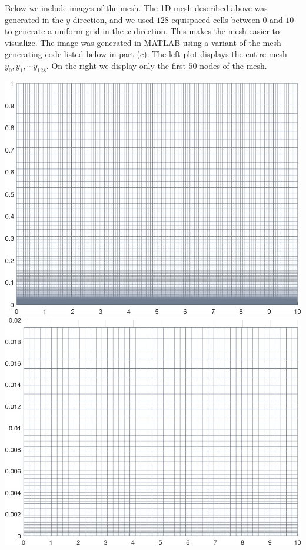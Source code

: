 \documentclass{article}
\begin{document}
Below we include images of the mesh. The 1D mesh described above was generated in the $y$-direction, and we used $128$ equispaced cells between $0$ and $10$ to generate a uniform grid in the $x$-direction. This makes the mesh easier to visualize. The image was generated in MATLAB using a variant of the mesh-generating code listed below in part (c).
The left plot displays the entire mesh $y_0, y_1, \cdots y_{128}$. On the right we display only the first $50$ nodes of the mesh. 

\vspace{1cm}

\includegraphics[width=.45\textwidth]{meshgrid.jpg} 
\includegraphics[width=.45\textwidth]{meshgrid_small.jpg} 
\end{document}
